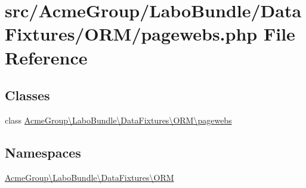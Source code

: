 \hypertarget{pagewebs_8php}{\section{src/\+Acme\+Group/\+Labo\+Bundle/\+Data\+Fixtures/\+O\+R\+M/pagewebs.php File Reference}
\label{pagewebs_8php}
}
\subsection*{Classes}
\begin{DoxyCompactItemize}
\item 
class \hyperlink{class_acme_group_1_1_labo_bundle_1_1_data_fixtures_1_1_o_r_m_1_1pagewebs}{Acme\+Group\textbackslash{}\+Labo\+Bundle\textbackslash{}\+Data\+Fixtures\textbackslash{}\+O\+R\+M\textbackslash{}pagewebs}
\end{DoxyCompactItemize}
\subsection*{Namespaces}
\begin{DoxyCompactItemize}
\item 
 \hyperlink{namespace_acme_group_1_1_labo_bundle_1_1_data_fixtures_1_1_o_r_m}{Acme\+Group\textbackslash{}\+Labo\+Bundle\textbackslash{}\+Data\+Fixtures\textbackslash{}\+O\+R\+M}
\end{DoxyCompactItemize}

